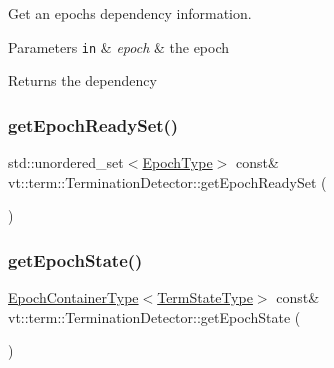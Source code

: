 Get an epoch\textquotesingle{}s dependency information. 


\begin{DoxyParams}[1]{Parameters}
\mbox{\tt in}  & {\em epoch} & the epoch\\
\hline
\end{DoxyParams}
\begin{DoxyReturn}{Returns}
the dependency 
\end{DoxyReturn}
\mbox{\label{structvt_1_1term_1_1_termination_detector_a8eb6730fc343957d0a788919b641762e}} 
\subsubsection{\texorpdfstring{get\+Epoch\+Ready\+Set()}{getEpochReadySet()}}
{\footnotesize\ttfamily std\+::unordered\+\_\+set$<$\hyperlink{namespacevt_a985a5adf291c34a3ca263b3378388236}{Epoch\+Type}$>$ const\& vt\+::term\+::\+Termination\+Detector\+::get\+Epoch\+Ready\+Set (\begin{DoxyParamCaption}{ }\end{DoxyParamCaption})\hspace{0.3cm}{\ttfamily [inline]}}

\mbox{\label{structvt_1_1term_1_1_termination_detector_a185004af9f842c58258128456ef27160}} 
\subsubsection{\texorpdfstring{get\+Epoch\+State()}{getEpochState()}}
{\footnotesize\ttfamily \hyperlink{structvt_1_1term_1_1_termination_detector_a69e2615b61e072977463eea5b20b7933}{Epoch\+Container\+Type}$<$\hyperlink{structvt_1_1term_1_1_term_action_ae4c635b69751d887666814700ed64d65}{Term\+State\+Type}$>$ const\& vt\+::term\+::\+Termination\+Detector\+::get\+Epoch\+State (\begin{DoxyParamCaption}{ }\end{DoxyParamCaption})\hspace{0.3cm}{\ttfamily [inline]}}

